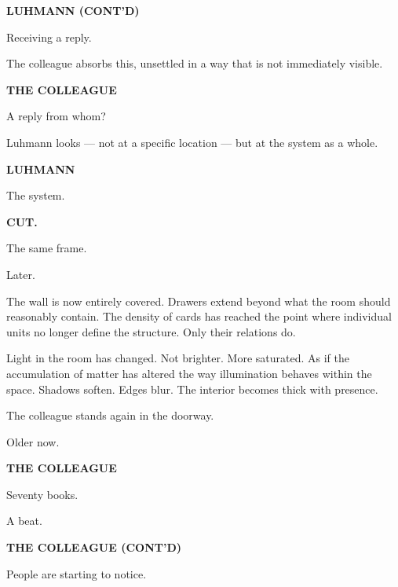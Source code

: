 \documentclass[12pt]{article}
\newcommand{\character}[1]{%
  \vspace{8pt}%
  \begin{center}\textbf{#1}\end{center}%
  \vspace{-4pt}%
}
\newenvironment{dialogue}{%
  \begin{center}%
  \begin{minipage}{0.62\textwidth}%
}{%
  \end{minipage}%
  \end{center}%
  \vspace{4pt}%
}
\newenvironment{action}{%
  \vspace{4pt}%
  \noindent\ignorespaces%
}{%
  \vspace{6pt}%
}
\begin{document}
\character{LUHMANN (CONT'D)}
\begin{dialogue}
Receiving a reply.
\end{dialogue}

\begin{action}
The colleague absorbs this, unsettled in a way that is not immediately visible.
\end{action}

\character{THE COLLEAGUE}
\begin{dialogue}
A reply from whom?
\end{dialogue}

\begin{action}
Luhmann looks — not at a specific location — but at the system as a whole.
\end{action}

\character{LUHMANN}
\begin{dialogue}
The system.
\end{dialogue}

\textbf{CUT.}

\begin{action}
The same frame.

Later.

The wall is now entirely covered. Drawers extend beyond what the room should reasonably contain. The density of cards has reached the point where individual units no longer define the structure. Only their relations do.

\medskip

Light in the room has changed. Not brighter. More saturated. As if the accumulation of matter has altered the way illumination behaves within the space. Shadows soften. Edges blur. The interior becomes thick with presence.

\medskip

The colleague stands again in the doorway.

Older now.
\end{action}

\character{THE COLLEAGUE}
\begin{dialogue}
Seventy books.
\end{dialogue}

\begin{action}
A beat.
\end{action}

\character{THE COLLEAGUE (CONT'D)}
\begin{dialogue}
People are starting to notice.
\end{dialogue}
\end{document}
